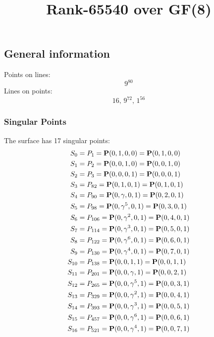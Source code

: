\documentclass{article}
\newcommand\setTBstruts{\def\T{\rule{0pt}{2.6ex}}%
\def\B{\rule[-1.2ex]{0pt}{0pt}}}
\newcommand{\bP}{{\bf P}}
\begin{document}
 
\setTBstruts



{\allowdisplaybreaks%






\title{Rank-65540 over GF(8)}
\author{}%
\maketitle%
%
{}



\subsection*{General information}
Points on lines:
$$
9^{80}$$
Lines on points:
$$
16,\,9^{72},\,1^{56}$$
\subsubsection*{Singular Points}
The surface has 17 singular points:\\
\begin{align*}
S_{0} &= P_{1}=\bP(0, 1, 0, 0) = \bP(0, 1, 0, 0)\\
S_{1} &= P_{2}=\bP(0, 0, 1, 0) = \bP(0, 0, 1, 0)\\
S_{2} &= P_{3}=\bP(0, 0, 0, 1) = \bP(0, 0, 0, 1)\\
S_{3} &= P_{82}=\bP(0, 1, 0, 1) = \bP(0, 1, 0, 1)\\
S_{4} &= P_{90}=\bP(0, \gamma , 0, 1) = \bP(0, 2, 0, 1)\\
S_{5} &= P_{98}=\bP(0, \gamma^{5}, 0, 1) = \bP(0, 3, 0, 1)\\
S_{6} &= P_{106}=\bP(0, \gamma^{2}, 0, 1) = \bP(0, 4, 0, 1)\\
S_{7} &= P_{114}=\bP(0, \gamma^{3}, 0, 1) = \bP(0, 5, 0, 1)\\
S_{8} &= P_{122}=\bP(0, \gamma^{6}, 0, 1) = \bP(0, 6, 0, 1)\\
S_{9} &= P_{130}=\bP(0, \gamma^{4}, 0, 1) = \bP(0, 7, 0, 1)\\
S_{10} &= P_{138}=\bP(0, 0, 1, 1) = \bP(0, 0, 1, 1)\\
S_{11} &= P_{201}=\bP(0, 0, \gamma , 1) = \bP(0, 0, 2, 1)\\
S_{12} &= P_{265}=\bP(0, 0, \gamma^{5}, 1) = \bP(0, 0, 3, 1)\\
S_{13} &= P_{329}=\bP(0, 0, \gamma^{2}, 1) = \bP(0, 0, 4, 1)\\
S_{14} &= P_{393}=\bP(0, 0, \gamma^{3}, 1) = \bP(0, 0, 5, 1)\\
S_{15} &= P_{457}=\bP(0, 0, \gamma^{6}, 1) = \bP(0, 0, 6, 1)\\
S_{16} &= P_{521}=\bP(0, 0, \gamma^{4}, 1) = \bP(0, 0, 7, 1)\\
\end{align*}
}
\end{document}

